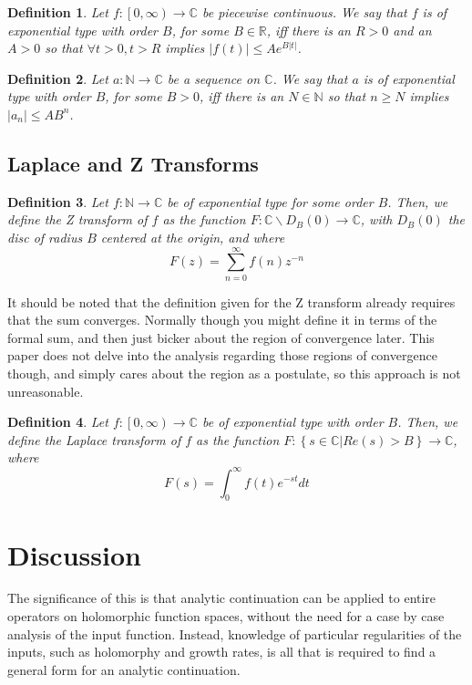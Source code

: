 \documentclass{article}
\newtheorem{definition}{Definition}
\begin{document}
	\begin{definition} \label{ def_exponential_type_cont }
		Let $f : \left[0, \infty \right) \rightarrow \mathbb{C}$ be piecewise continuous. We say that $f$ is of exponential type with order $B$, for some $B \in \mathbb{R}$, iff there is an $R > 0$ and an $A > 0$ so that $\forall t > 0, t > R $ implies $ \left| f(t) \right| \leq A e^{ B \left| t \right| } $.
	\end{definition}

	\begin{definition} \label{ def_exponential_type_discrete }
		Let $a : \mathbb{N} \rightarrow \mathbb{C}$ be a sequence on $\mathbb{C}$. We say that $a$ is of exponential type with order $B$, for some $B > 0$, iff there is an $N \in \mathbb{N}$ so that $ n \geq N $ implies $ \left| a_n \right| \leq A B^{ n } $.
	\end{definition}

	

	\subsection{Laplace and Z Transforms}

	\begin{definition} \label{ def_Z_Transform }
		Let $ f : \mathbb{N} \rightarrow \mathbb{C} $ be of exponential type for some order $B$. Then, we define the Z transform of $f$ as the function $F : \mathbb{C} \backslash D_{B}(0) \rightarrow \mathbb{C}$, with $D_{B}(0)$ the disc of radius $B$ centered at the origin, and where
		$$ F \left( z \right) = \sum_{n = 0}^{\infty} f \left( n \right) z^{-n} $$
	\end{definition}

	It should be noted that the definition given for the Z transform already requires that the sum converges. Normally though you might define it in terms of the formal sum, and then just bicker about the region of convergence later. This paper does not delve into the analysis regarding those regions of convergence though, and simply cares about the region as a postulate, so this approach is not unreasonable. 
	
	\begin{definition} \label{ def_Laplace_Transform }
		Let $ f : \left[ 0, \infty \right) \rightarrow \mathbb{C}$ be of exponential type with order $B$. Then, we define the Laplace transform of $f$ as the function $ F : \left\{ s \in \mathbb{C} | Re(s) > B \right\} \rightarrow \mathbb{C}$, where
		$$ F(s) = \int_{0}^{\infty} f(t) e^{-s t} dt $$
	\end{definition}
	
	\section{ Discussion }
	
	The significance of this is that analytic continuation can be applied to entire operators on holomorphic function spaces, without the need for a case by case analysis of the input function. Instead, knowledge of particular regularities of the inputs, such as holomorphy and growth rates, is all that is required to find a general form for an analytic continuation. 
	
	
\end{document}
